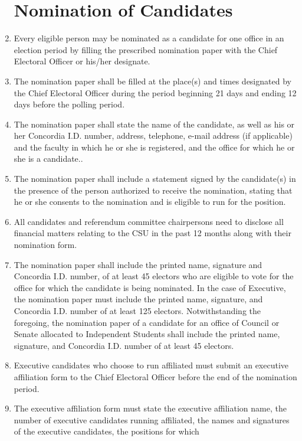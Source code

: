 \documentclass[oneside]{book}
\begin{document}
\begin{enumerate}
\section{\label{Nomination_of_Candidates}Nomination of Candidates }
\item Every eligible person may be nominated as a candidate for one office
in an election period by filling the prescribed nomination paper with
the Chief Electoral Officer or his/her designate. 
\item The nomination paper shall be filled at the place(s) and times designated
by the Chief Electoral Officer during the period beginning 21 days
and ending 12 days before the polling period. 
\item The nomination paper shall state the name of the candidate, as well
as his or her Concordia I.D. number, address, telephone, e-mail address
(if applicable) and the faculty in which he or she is registered,
and the office for which he or she is a candidate.. 
\item The nomination paper shall include a statement signed by the candidate(s)
in the presence of the person authorized to receive the nomination,
stating that he or she consents to the nomination and is eligible
to run for the position. 
\item All candidates and referendum committee chairpersons need to disclose
all financial matters relating to the CSU in the past 12 months along
with their nomination form. 
\item \label{enu:nomination-paper}The nomination paper shall include the
printed name, signature and Concordia I.D. number, of at least 45
electors who are eligible to vote for the office for which the candidate
is being nominated. In the case of Executive, the nomination paper
must include the printed name, signature, and Concordia I.D. number
of at least 125 electors. Notwithstanding the foregoing, the nomination
paper of a candidate for an office of Council or Senate allocated
to Independent Students shall include the printed name, signature,
and Concordia I.D. number of at least 45 electors. 
\item Executive candidates who choose to run affiliated must submit an executive
affiliation form to the Chief Electoral Officer before the end of
the nomination period. 
\item The executive affiliation form must state the executive affiliation
name, the number of executive candidates running affiliated, the names
and signatures of the executive candidates, the positions for which

\end{enumerate}
\end{document}
